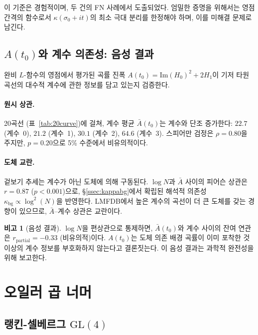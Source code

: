\documentclass[11pt, a4paper]{article}
\theoremstyle{plain}
\theoremstyle{definition}
\newtheorem{remark}{비고}[section]
\begin{document}
이 기준은 경험적이며, 두 건의 FN 사례에서 도출되었다.
엄밀한 증명을 위해서는 영점 간격의 함수로서
$\kappa(\sigma_{0}+it)$의 최소 극대 분리를 한정해야 하며,
이를 미해결 문제로 남긴다.


\subsection{$A(t_{0})$와 계수 의존성: 음성 결과}
\label{ssec:arank}

완비 $L$-함수의 영점에서 평가된 곡률 진폭
$A(t_{0}) = \mathrm{Im}(H_{0})^{2} + 2H_{1}$이
기저 타원곡선의 대수적 계수에 관한 정보를 담고 있는지 검증한다.

\paragraph{원시 상관.}
20곡선 (표~\ref{tab:20curve})에 걸쳐,
계수 평균 $\bar{A}(t_{0})$는 계수와 단조 증가한다:
$22.7$ (계수~0), $21.2$ (계수~1), $30.1$ (계수~2), $64.6$ (계수~3).
스피어만 검정은 $\rho=0.80$을 주지만,
$p=0.20$으로 5\% 수준에서 비유의적이다.

\paragraph{도체 교란.}
겉보기 추세는 계수가 아닌 도체에 의해 구동된다.
$\log N$과 $\bar{A}$ 사이의 피어슨 상관은
$r=0.87$ ($p<0.001$)으로,
\S\ref{ssec:kappabg}에서 확립된 해석적 의존성
$\kappa_{\mathrm{bg}} \propto \log^{2}(N)$을 반영한다.
LMFDB에서 높은 계수의 곡선이 더 큰 도체를 갖는 경향이 있으므로,
$\bar{A}$--계수 상관은 교란이다.

\begin{remark}[음성 결과]
\label{rem:arank}
$\log N$을 편상관으로 통제하면,
$\bar{A}(t_{0})$와 계수 사이의 잔여 연관은
$r_{\mathrm{partial}} = -0.33$ (비유의적)이다.
$A(t_{0})$는 도체 의존 배경 곡률이 이미 포착한 것 이상의
계수 정보를 부호화하지 않는다고 결론짓는다.
이 음성 결과는 과학적 완전성을 위해 보고한다.
\end{remark}


\section{오일러 곱 너머}
\label{sec:beyond}

\subsection{랭킨-셀베르그 $\mathrm{GL}(4)$}
\label{sec:gl4rs}
\end{document}
